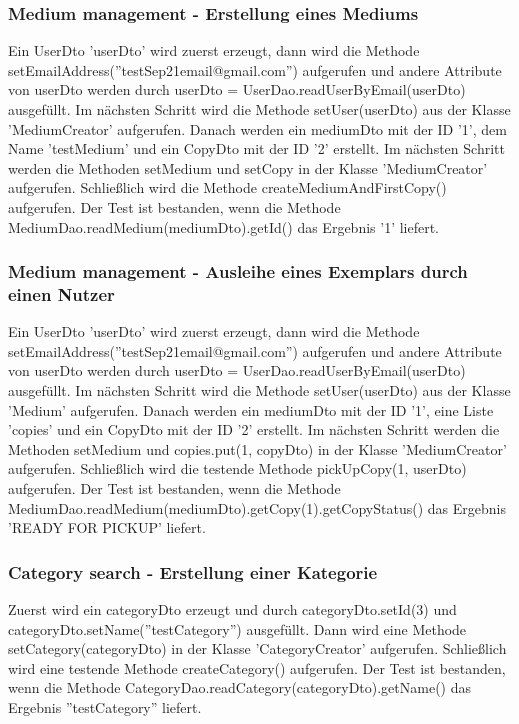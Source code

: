 \documentclass{article}
\begin{document}
\subsubsection{Medium management - Erstellung eines Mediums}
Ein UserDto 'userDto' wird zuerst erzeugt, dann wird die Methode \linebreak setEmailAddress(''testSep21email@gmail.com'') aufgerufen und andere Attribute von userDto werden durch userDto = UserDao.readUserByEmail(userDto) ausgefüllt. Im nächsten Schritt wird die Methode setUser(userDto) aus der Klasse 'MediumCreator' aufgerufen. Danach werden ein mediumDto mit der ID '1', dem Name 'testMedium' und ein CopyDto mit der ID '2' erstellt. Im nächsten Schritt werden die Methoden setMedium und setCopy in der Klasse 'MediumCreator' aufgerufen. Schließlich wird die Methode createMediumAndFirstCopy() aufgerufen. Der Test ist bestanden, wenn die Methode MediumDao.readMedium(mediumDto).getId() das Ergebnis '1' liefert.

\subsubsection{Medium management - Ausleihe eines Exemplars durch einen Nutzer}
Ein UserDto 'userDto' wird zuerst erzeugt, dann wird die Methode \linebreak setEmailAddress(''testSep21email@gmail.com'') aufgerufen und andere Attribute von userDto werden durch userDto = UserDao.readUserByEmail(userDto) ausgefüllt. Im nächsten Schritt wird die Methode setUser(userDto) aus der Klasse 'Medium' aufgerufen. Danach werden ein mediumDto mit der ID '1', eine Liste 'copies' und ein CopyDto mit der ID '2' erstellt. Im nächsten Schritt werden die Methoden setMedium und copies.put(1, copyDto) in der Klasse 'MediumCreator' aufgerufen. Schließlich wird die testende Methode pickUpCopy(1, userDto) aufgerufen. Der Test ist bestanden, wenn die Methode MediumDao.readMedium(mediumDto).getCopy(1).getCopyStatus() das Ergebnis 'READY FOR PICKUP' liefert.

\subsubsection{Category search - Erstellung einer Kategorie}
Zuerst wird ein categoryDto erzeugt und durch categoryDto.setId(3) und \linebreak categoryDto.setName(''testCategory'') ausgefüllt. Dann wird eine Methode \linebreak setCategory(categoryDto) in der Klasse 'CategoryCreator' aufgerufen. Schließlich wird eine testende Methode createCategory() aufgerufen. Der Test ist bestanden, wenn die Methode \linebreak CategoryDao.readCategory(categoryDto).getName() das Ergebnis ''testCategory'' liefert.
\end{document}
